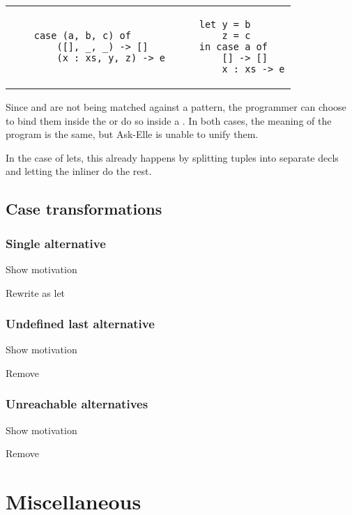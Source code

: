 \begin{center}
\begin{tabular}{ m{15em} | m{14em} }
    \begin{verbatim}
    case (a, b, c) of
        ([], _, _) -> []
        (x : xs, y, z) -> e
    \end{verbatim}
    &
    \begin{verbatim}
    let y = b
        z = c
    in case a of
        [] -> []
        x : xs -> e
    \end{verbatim}
\end{tabular}
\end{center}

Since  and  are not being matched against a pattern, the programmer can choose to bind them inside the  or do so inside a . In both cases, the meaning of the program is the same, but Ask-Elle is unable to unify them.

In the case of lets, this already happens by splitting tuples into separate decls and letting the inliner do the rest.

\subsection{Case transformations}

\subsubsection{Single alternative}

Show motivation

Rewrite as let

\subsubsection{Undefined last alternative}

Show motivation

Remove

\subsubsection{Unreachable alternatives}

Show motivation

Remove

\section{Miscellaneous}

